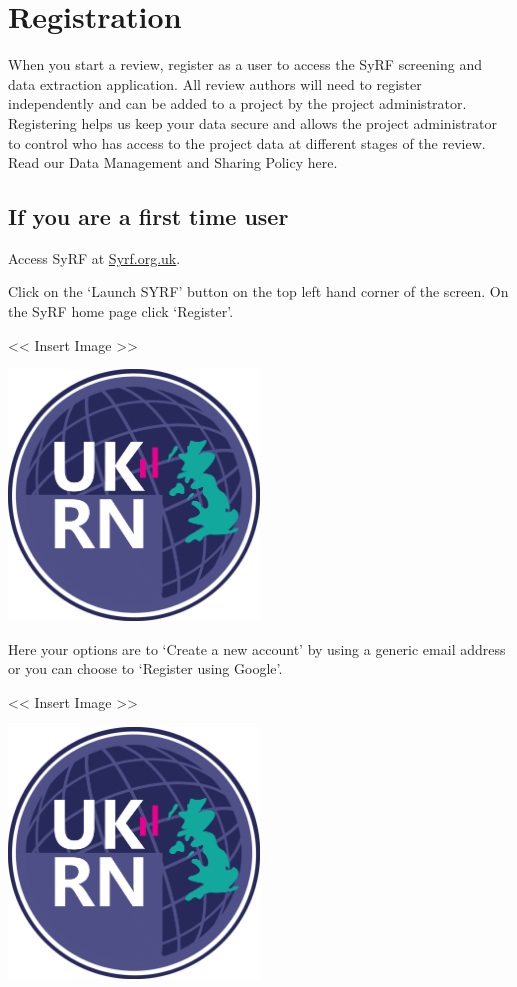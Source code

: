 \documentclass[]{book}
\begin{document}
\chapter{Registration}\label{registration}

When you start a review, register as a user to access the SyRF screening
and data extraction application. All review authors will need to
register independently and can be added to a project by the project
administrator. Registering helps us keep your data secure and allows the
project administrator to control who has access to the project data at
different stages of the review. Read our Data Management and Sharing
Policy here.

\section{If you are a first time
user}\label{if-you-are-a-first-time-user}

Access SyRF at \href{http://syrf.org.uk}{Syrf.org.uk}.

Click on the `Launch SYRF' button on the top left hand corner of the
screen. On the SyRF home page click `Register'.

\textless{}\textless{} Insert Image \textgreater{}\textgreater{}

\includegraphics[width=0.50000\textwidth,height=0.50000\textwidth]{figs/evidence-triangle.png}

Here your options are to `Create a new account' by using a generic email
address or you can choose to `Register using Google'.

\textless{}\textless{} Insert Image \textgreater{}\textgreater{}

\includegraphics[width=0.50000\textwidth,height=0.50000\textwidth]{figs/evidence-triangle.png}
\end{document}
